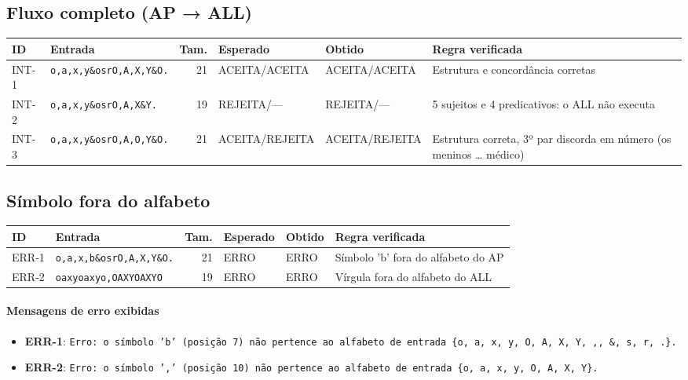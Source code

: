 \subsection*{Fluxo completo (AP → ALL)}
\begin{longtable}{l p{5.2cm} r l l p{5cm}}
\textbf{ID} & \textbf{Entrada} & \textbf{Tam.} & \textbf{Esperado} & \textbf{Obtido} & \textbf{Regra verificada} \\ \hline \endhead
INT-1 & \texttt{o,a,x,y\&osrO,A,X,Y\&O.} & 21 & ACEITA/ACEITA & ACEITA/ACEITA & Estrutura e concordância corretas \\
INT-2 & \texttt{o,a,x,y\&osrO,A,X\&Y.} & 19 & REJEITA/— & REJEITA/— & 5 sujeitos e 4 predicativos: o ALL não executa \\
INT-3 & \texttt{o,a,x,y\&osrO,A,O,Y\&O.} & 21 & ACEITA/REJEITA & ACEITA/REJEITA & Estrutura correta, 3º par discorda em número (os meninos \ldots{} médico) \\
\end{longtable}
\subsection*{Símbolo fora do alfabeto}
\begin{longtable}{l p{5.2cm} r l l p{5cm}}
\textbf{ID} & \textbf{Entrada} & \textbf{Tam.} & \textbf{Esperado} & \textbf{Obtido} & \textbf{Regra verificada} \\ \hline \endhead
ERR-1 & \texttt{o,a,x,b\&osrO,A,X,Y\&O.} & 21 & ERRO & ERRO & Símbolo 'b' fora do alfabeto do AP \\
ERR-2 & \texttt{oaxyoaxyo,OAXYOAXYO} & 19 & ERRO & ERRO & Vírgula fora do alfabeto do ALL \\
\end{longtable}
\paragraph{Mensagens de erro exibidas}
\begin{itemize}
\item \textbf{ERR-1}: \texttt{Erro: o símbolo 'b' (posição 7) não pertence ao alfabeto de entrada \{o, a, x, y, O, A, X, Y, ,, \&, s, r, .\}.}
\item \textbf{ERR-2}: \texttt{Erro: o símbolo ',' (posição 10) não pertence ao alfabeto de entrada \{o, a, x, y, O, A, X, Y\}.}
\end{itemize}
